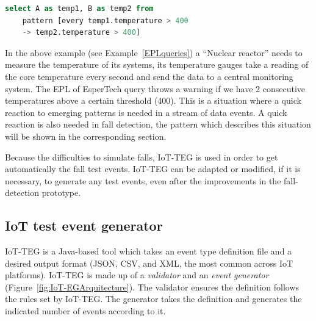 \documentclass[conference]{IEEEtran}
\theoremstyle{definition}
\begin{document}
 \renewcommand{\lstlistingname}{Example}
 
 \begin{lstlisting}[basicstyle=\ttfamily\footnotesize,language=SQL,caption=EPL of EsperTech query example,label=EPLqueries]
  select A as temp1, B as temp2 from 
    pattern [every temp1.temperature > 400 
    -> temp2.temperature > 400]
 \end{lstlisting}
 
In the above example (see Example~\ref{EPLqueries}) a ``Nuclear reactor'' needs to measure the temperature
of its systems, its temperature gauges take a reading of the core temperature every second and send the data 
to a central monitoring system. The EPL of EsperTech query throws a warning if we have 2 consecutive 
temperatures above a certain threshold (400). This is a situation where a quick reaction to emerging patterns 
is needed in a stream of data events. A quick reaction is also needed in fall detection, the pattern which 
describes this situation will be shown in the corresponding section.
 
Because the difficulties to simulate falls, IoT-TEG is used in order to get automatically the fall test events. 
IoT-TEG can be adapted or modified, if it is necessary, to generate any test events, even after the improvements 
in the fall-detection prototype.

\subsection{IoT test event generator}
\label{iotteg}

IoT-TEG is a Java-based tool which takes an event type definition file and a desired output
format (JSON, CSV, and XML, the most common across IoT platforms). IoT-TEG is made up of a
\emph{validator} and an \emph{event generator} (Figure~\ref{fig:IoT-EGArquitecture}). The
validator ensures the definition follows the rules set by IoT-TEG. The generator takes the
definition and generates the indicated number of events according to it.
\end{document}
